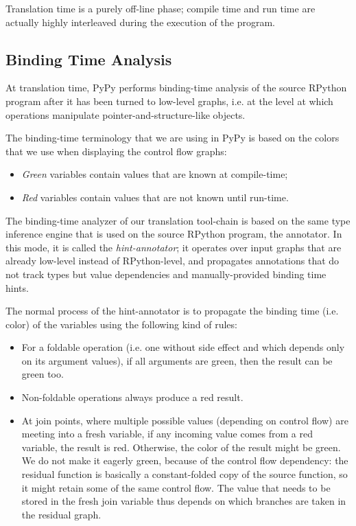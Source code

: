 Translation time is a purely off-line phase; compile time and run time are
actually highly interleaved during the execution of the program.

\subsection{Binding Time Analysis}

At translation time, PyPy performs binding-time analysis of the source
RPython program after it has been turned to low-level graphs, i.e. at
the level at which operations manipulate pointer-and-structure-like
objects.

The binding-time terminology that we are using in PyPy is based on the
colors that we use when displaying the control flow graphs:

\begin{itemize}
\item \emph{Green} variables contain values that are known at compile-time;
\item \emph{Red} variables contain values that are not known until run-time.
\end{itemize}

The binding-time analyzer of our translation tool-chain is based on the
same type inference engine that is used on the source RPython program,
the annotator.  In this mode, it is called the \emph{hint-annotator}; it
operates over input graphs that are already low-level instead of
RPython-level, and propagates annotations that do not track types but
value dependencies and manually-provided binding time hints.

The normal process of the hint-annotator is to propagate the binding
time (i.e. color) of the variables using the following kind of rules:

\begin{itemize}
\item For a foldable operation (i.e. one without side effect and which depends
only on its argument values), if all arguments are green, then the result can
be green too.

\item Non-foldable operations always produce a red result.

\item At join points, where multiple possible values (depending on control
flow) are meeting into a fresh variable, if any incoming value comes from a red
variable, the result is red.  Otherwise, the color of the result might be
green.  We do not make it eagerly green, because of the control flow
dependency: the residual function is basically a constant-folded copy of the
source function, so it might retain some of the same control flow.  The value
that needs to be stored in the fresh join variable thus depends on which
branches are taken in the residual graph.
\end{itemize}

